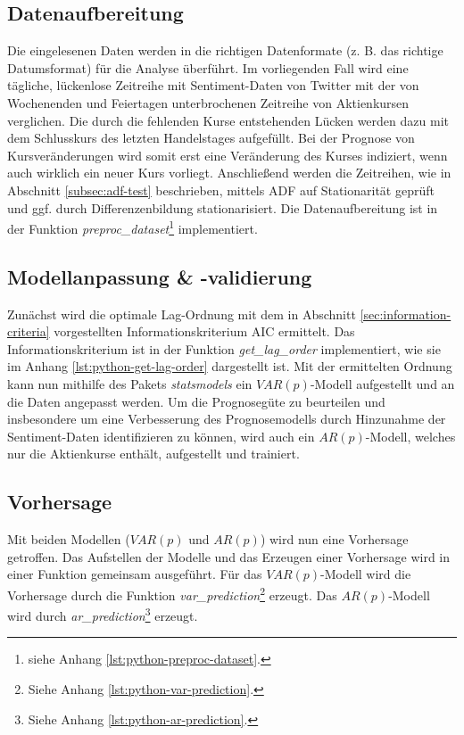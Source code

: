 \documentclass[
	a4paper,
	12pt,
	bibliography=totocnumbered,
	twoside,
]{scrreprt}
\begin{document}
\subsection*{Datenaufbereitung}
Die eingelesenen Daten werden in die richtigen Datenformate (z. B. das richtige Datumsformat) für die Analyse überführt. Im vorliegenden Fall wird eine tägliche, lückenlose Zeitreihe mit Sentiment-Daten von Twitter mit der von Wochenenden und Feiertagen unterbrochenen Zeitreihe von Aktienkursen verglichen. Die durch die fehlenden Kurse entstehenden Lücken werden dazu mit dem Schlusskurs des letzten Handelstages aufgefüllt. Bei der Prognose von Kursveränderungen wird somit erst eine Veränderung des Kurses indiziert, wenn auch wirklich ein neuer Kurs vorliegt. Anschließend werden die Zeitreihen, wie in Abschnitt \ref{subsec:adf-test} beschrieben, mittels ADF auf Stationarität geprüft und ggf. durch Differenzenbildung stationarisiert. Die Datenaufbereitung ist in der Funktion \textit{preproc\_dataset}\footnote{siehe Anhang \ref{lst:python-preproc-dataset}.} implementiert. \\


\subsection*{Modellanpassung \& -validierung}
Zunächst wird die optimale Lag-Ordnung mit dem in Abschnitt \ref{sec:information-criteria} vorgestellten Informationskriterium AIC ermittelt. Das Informationskriterium ist in der Funktion \textit{get\_lag\_order} implementiert, wie sie im Anhang \ref{lst:python-get-lag-order} dargestellt ist.
Mit der ermittelten Ordnung kann nun mithilfe des Pakets \textit{statsmodels} ein $VAR(p)$-Modell aufgestellt und an die Daten angepasst werden. Um die Prognosegüte zu beurteilen und insbesondere um eine Verbesserung des Prognosemodells durch Hinzunahme der Sentiment-Daten identifizieren zu können, wird auch ein $AR(p)$-Modell, welches nur die Aktienkurse enthält, aufgestellt und trainiert.\\


\subsection*{Vorhersage}
Mit beiden Modellen ($VAR(p)$ und $AR(p)$) wird nun eine Vorhersage getroffen. Das Aufstellen der Modelle und das Erzeugen einer Vorhersage wird in einer Funktion gemeinsam ausgeführt. Für das $VAR(p)$-Modell wird die Vorhersage durch die Funktion \textit{var\_prediction}\footnote{Siehe Anhang \ref{lst:python-var-prediction}.} erzeugt. Das $AR(p)$-Modell wird durch \textit{ar\_prediction}\footnote{Siehe Anhang \ref{lst:python-ar-prediction}.} erzeugt. \\
\end{document}
